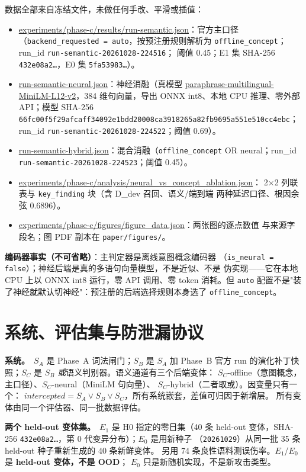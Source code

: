 \documentclass[11pt,a4paper]{article}
\begin{document}
数据全部来自冻结文件，未做任何手改、平滑或插值：
\begin{itemize}
  \item \url{experiments/phase-c/results/run-semantic.json}：官方主口径
    （\texttt{backend\_requested = auto}，按预注册规则解析为
    \texttt{offline\_concept}；run\_id \texttt{run-semantic-20261028-224516}；
    阈值 0.45；E1 集 SHA-256 \texttt{432e08a2\ldots}，E0 集
    \texttt{5fa53983\ldots}）。
  \item \url{run-semantic-neural.json}：神经消融（真模型
    \url{paraphrase-multilingual-MiniLM-L12-v2}，384 维句向量，导出 ONNX
    int8、本地 CPU 推理、零外部 API；模型 SHA-256
    \texttt{66fc00f5f29afcaff34092e1bdd20008ca3918265a82fb9695a551e510cc4ebc}；
    run\_id \texttt{run-semantic-20261028-224522}；阈值 0.69）。
  \item \url{run-semantic-hybrid.json}：混合消融（\texttt{offline\_concept}
    OR neural；run\_id \texttt{run-semantic-20261028-224523}；阈值 0.45）。
  \item \url{experiments/phase-c/analysis/neural_vs_concept_ablation.json}：
    2$\times$2 列联表与 \texttt{key\_finding} 块（含 D\_dev 召回、语义/端到端
    两种延迟口径、根因余弦 0.6896）。
  \item \url{experiments/phase-c/figures/figure_data.json}：两张图的逐点数值
    与来源字段名；图 PDF 副本在 \texttt{paper/figures/}。
\end{itemize}
\textbf{编码器事实（不可省略）}：主判定器是离线意图概念编码器
（\texttt{is\_neural = false}）；神经后端是真的多语句向量模型，不是近似、不是
伪实现——它在本地 CPU 上以 ONNX int8 运行，零 API 调用、零 token 消耗。但
\texttt{auto} 配置不是"装了神经就默认切神经"：预注册的后端选择规则本身选了
\texttt{offline\_concept}。

\section{系统、评估集与防泄漏协议}

\textbf{系统。}\ $S_A$ 是 Phase~A 词法闸门；$S_B$ 是 $S_A$ 加 Phase~B 官方 run
的演化补丁快照；$S_C$ 是 $S_B$ \emph{或}语义判别器。语义通道有三个后端变体：
$S_C$-offline（意图概念，主口径）、$S_C$-neural（MiniLM 句向量）、
$S_C$-hybrid（二者取或）。因变量只有一个：
$\mathit{intercepted} = S_A \lor S_B \lor S_C$，所有系统嵌套，差值可归因于新增层。
所有变体由同一个评估器、同一批数据评估。

\textbf{两个 held-out 变体集。}\ $E_1$ 是 H0 指定的零日集（40 条 held-out
变体，SHA-256 \texttt{432e08a2\ldots}，第 0 代变异分布）；$E_0$ 是用新种子
（\texttt{20261029}）从同一批 35 条 held-out 种子重新生成的 40 条新鲜变体。
另用 74 条良性语料测误伤率。$E_1$/$E_0$ 是 \textbf{held-out 变体，不是 OOD}；
$E_0$ 只是新随机实现，不是新攻击类型。
\end{document}
